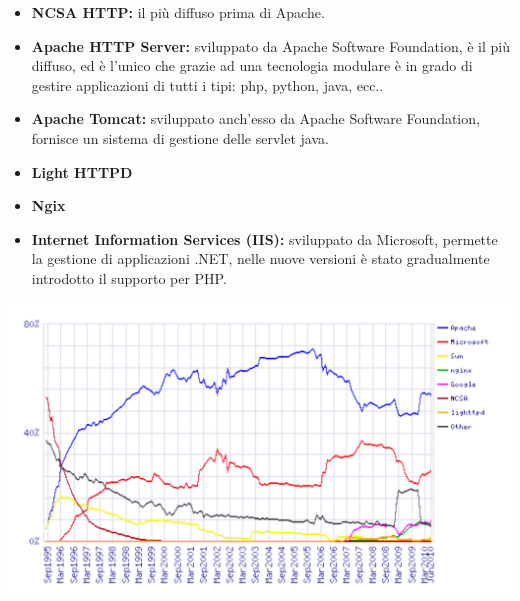 \documentclass[a4paper]{report}
\begin{document}
\begin{itemize}
\item \textbf{NCSA HTTP:} il più diffuso prima di Apache.
\item \textbf{Apache HTTP Server:} sviluppato da Apache Software Foundation, è il più diffuso, ed è l'unico che grazie ad una tecnologia modulare è in grado di gestire applicazioni di tutti i tipi: php, python, java, ecc..
\item \textbf{Apache Tomcat:} sviluppato anch'esso da Apache Software Foundation, fornisce un sistema di gestione delle servlet java.
\item \textbf{Light HTTPD}
\item \textbf{Ngix}
\item \textbf{Internet Information Services (IIS):} sviluppato da Microsoft, permette la gestione di applicazioni .NET, nelle nuove versioni è stato gradualmente introdotto il supporto per PHP.
\end{itemize}
\begin{center}
\includegraphics[scale=0.5]{diffusioneweb.png}
\end{center}
\end{document}
